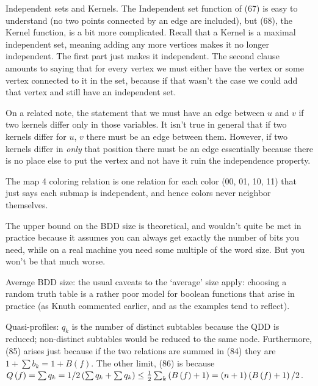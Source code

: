 
\noindent [p231] Independent sets and Kernels.\hfil\break  
The Independent set function of (67) is easy to understand (no two points connected
by an edge are included), but (68), the Kernel function, is a bit
more complicated.  Recall that a Kernel is a maximal independent set,
meaning adding any more vertices makes it no longer independent.
The first part just makes it independent.  The second clause amounts
to saying that for every vertex we must either have the vertex or
some vertex connected to it in the set, because if that wasn't the case 
we could add that vertex and still have an independent set.

On a related note, the statement that we must have an edge between
$u$ and $v$ if two kernels differ only in those variables.  It isn't
true in general that if two kernels differ for $u$, $v$ there must be 
an edge between them. However, if two kernels differ in {\it only} that
position there must be an edge essentially because there is no place
else to put the vertex and not have it ruin the independence property.


\noindent [p 233] The map 4 coloring relation is one relation
for each color (00, 01, 10, 11) that just says each submap
is independent, and hence colors never neighbor themselves.


\noindent [p 234] The upper bound on the BDD size is theoretical,
and wouldn't quite be met in practice because it assumes you
can always get exactly the number of bits you need, while
on a real machine you need some multiple of the word size.
But you won't be that much worse.

 Average BDD size: the usual
caveats to the `average' size apply: choosing a random truth
table is a rather poor model for boolean functions that arise
in practice (as Knuth commented earlier, and as the examples
tend to reflect).

 Quasi-profiles: $q_k$ is the
number of distinct subtables because the QDD is reduced;
non-distinct subtables would be reduced to the same node.
Furthermore, (85)  arises just because if the two relations
are summed in (84) they are $1 + \sum b_k = 1 + B\left(f\right)$.
The other limit, (86) is because
$Q\left(f\right) = \sum q_k =
1/2 \left(\sum q_k + \sum q_k\right)
\le {1 \over 2} \sum_k \left(B\left(f\right) + 1\right) = \left(n + 1\right)
\left(B\left(f\right) + 1\right) / 2$.

